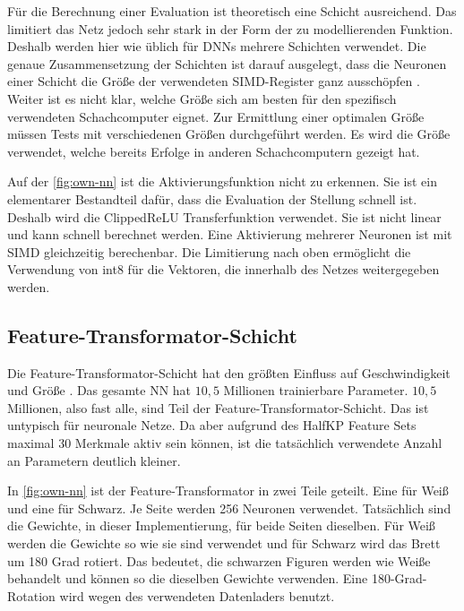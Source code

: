 Für die Berechnung einer Evaluation ist theoretisch eine Schicht ausreichend. Das limitiert das Netz jedoch sehr stark in der Form der zu modellierenden Funktion. Deshalb werden hier wie üblich für \acp{DNN} mehrere Schichten verwendet. Die genaue Zusammensetzung der Schichten ist darauf ausgelegt, dass die Neuronen einer Schicht die Größe der verwendeten \ac{SIMD}-Register ganz ausschöpfen \cite{YNasu2018}. Weiter ist es nicht klar, welche Größe sich am besten für den spezifisch verwendeten Schachcomputer eignet. Zur Ermittlung einer optimalen Größe müssen Tests mit verschiedenen Größen durchgeführt werden. Es wird die Größe verwendet, welche bereits Erfolge in anderen Schachcomputern gezeigt hat.

Auf der \autoref{fig:own-nn} ist die Aktivierungsfunktion nicht zu erkennen. Sie ist ein elementarer Bestandteil dafür, dass die Evaluation der Stellung schnell ist. Deshalb wird die Clipped\ac{ReLU} Transferfunktion verwendet. Sie ist nicht linear und kann schnell berechnet werden. Eine Aktivierung mehrerer Neuronen ist mit \ac{SIMD} gleichzeitig berechenbar. Die Limitierung nach oben ermöglicht die Verwendung von int8 für die Vektoren, die innerhalb des Netzes weitergegeben werden.

\subsection{Feature-Transformator-Schicht}

Die Feature-Transformator-Schicht hat den größten Einfluss auf Geschwindigkeit und Größe \cite{StockfishNNUE}. Das gesamte \ac{NN} hat $10,5$ Millionen trainierbare Parameter. $10,5$ Millionen, also fast alle, sind Teil der Feature-Transformator-Schicht. Das ist untypisch für neuronale Netze. Da aber aufgrund des HalfKP Feature Sets maximal 30 Merkmale aktiv sein können, ist die tatsächlich verwendete Anzahl an Parametern deutlich kleiner.

In \autoref{fig:own-nn} ist der Feature-Transformator in zwei Teile geteilt. Eine für Weiß und eine für Schwarz. Je Seite werden 256 Neuronen verwendet. Tatsächlich sind die Gewichte, in dieser Implementierung, für beide Seiten dieselben. Für Weiß werden die Gewichte so wie sie sind verwendet und für Schwarz wird das Brett um 180 Grad rotiert. Das bedeutet, die schwarzen Figuren werden wie Weiße behandelt und können so die dieselben Gewichte verwenden. Eine 180-Grad-Rotation wird wegen des verwendeten Datenladers benutzt.

